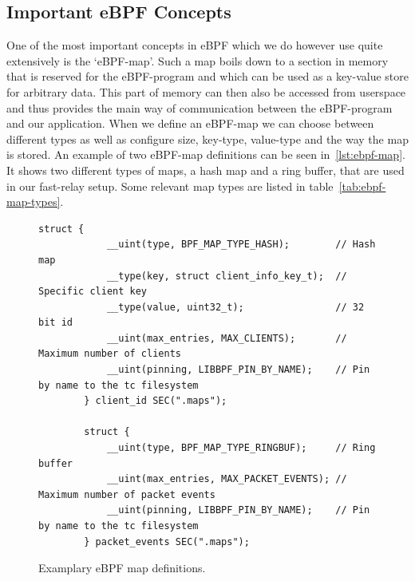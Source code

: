 \subsection{Important eBPF Concepts}
One of the most important concepts in eBPF which we do however use quite extensively is 
the `eBPF-map'.
Such a map boils down to a section in memory that is reserved for the eBPF-program
and which can be used as a key-value store for arbitrary data.
This part of memory can then also be accessed from userspace and thus provides the main 
way of communication between the eBPF-program and our application.
When we define an eBPF-map we can choose between different types as well as configure
size, key-type, value-type and the way the map is stored. %
An example of two eBPF-map definitions can be seen in~\autoref{lst:ebpf-map}.
It shows two different types of maps, a hash map and a ring buffer, that are used in
our fast-relay setup.
Some relevant map types are listed in table~\autoref{tab:ebpf-map-types}.


\begin{figure}
    \begin{lstlisting}[style=CStyle]
        struct {
            __uint(type, BPF_MAP_TYPE_HASH);        // Hash map
            __type(key, struct client_info_key_t);  // Specific client key
            __type(value, uint32_t);                // 32 bit id
            __uint(max_entries, MAX_CLIENTS);       // Maximum number of clients
            __uint(pinning, LIBBPF_PIN_BY_NAME);    // Pin by name to the tc filesystem
        } client_id SEC(".maps");

        struct {
            __uint(type, BPF_MAP_TYPE_RINGBUF);     // Ring buffer
            __uint(max_entries, MAX_PACKET_EVENTS); // Maximum number of packet events
            __uint(pinning, LIBBPF_PIN_BY_NAME);    // Pin by name to the tc filesystem
        } packet_events SEC(".maps");
    \end{lstlisting}
    \caption{Examplary eBPF map definitions.}\label{lst:ebpf-map}
\end{figure}

